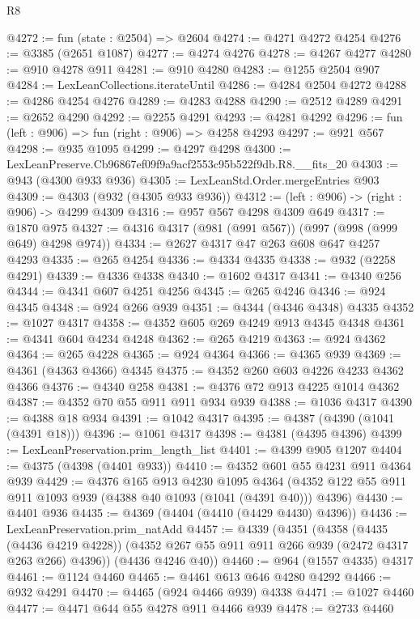 \begin{lexlean}{R8}
\begin{coremodule}
@4272 := fun (state : @2504) => @2604
@4274 := @4271 @4272 @4254
@4276 := @3385 (@2651 @1087)
@4277 := @4274 @4276
@4278 := @4267 @4277
@4280 := @910 @4278 @911
@4281 := @910 @4280
@4283 := @1255 @2504 @907
@4284 := LexLeanCollections.iterateUntil
@4286 := @4284 @2504 @4272
@4288 := @4286 @4254 @4276
@4289 := @4283 @4288
@4290 := @2512 @4289
@4291 := @2652 @4290
@4292 := @2255 @4291
@4293 := @4281 @4292
@4296 := fun (left : @906) => fun (right : @906) => @4258 @4293
@4297 := @921 @567
@4298 := @935 @1095
@4299 := @4297 @4298
@4300 := LexLeanPreserve.Cb96867ef09f9a9acf2553c95b522f9db.R8.__fits_20
@4303 := @943 (@4300 @933 @936)
@4305 := LexLeanStd.Order.mergeEntries @903
@4309 := @4303 (@932 (@4305 @933 @936))
@4312 := (left : @906) -> (right : @906) -> @4299 @4309
@4316 := @957 @567 @4298 @4309 @649
@4317 := @1870 @975
@4327 := @4316 @4317 (@981 (@991 @567)) (@997 (@998 (@999 @649) @4298 @974))
@4334 := @2627 @4317 @47 @263 @608 @647 @4257 @4293
@4335 := @265 @4254
@4336 := @4334 @4335
@4338 := @932 (@2258 @4291)
@4339 := @4336 @4338
@4340 := @1602 @4317
@4341 := @4340 @256
@4344 := @4341 @607 @4251 @4256
@4345 := @265 @4246
@4346 := @924 @4345
@4348 := @924 @266 @939
@4351 := @4344 (@4346 @4348) @4335
@4352 := @1027 @4317
@4358 := @4352 @605 @269 @4249 @913 @4345 @4348
@4361 := @4341 @604 @4234 @4248
@4362 := @265 @4219
@4363 := @924 @4362
@4364 := @265 @4228
@4365 := @924 @4364
@4366 := @4365 @939
@4369 := @4361 (@4363 @4366) @4345
@4375 := @4352 @260 @603 @4226 @4233 @4362 @4366
@4376 := @4340 @258
@4381 := @4376 @72 @913 @4225 @1014 @4362
@4387 := @4352 @70 @55 @911 @911 @934 @939
@4388 := @1036 @4317
@4390 := @4388 @18 @934
@4391 := @1042 @4317
@4395 := @4387 (@4390 (@1041 (@4391 @18)))
@4396 := @1061 @4317
@4398 := @4381 (@4395 @4396)
@4399 := LexLeanPreservation.prim_length_list
@4401 := @4399 @905 @1207
@4404 := @4375 (@4398 (@4401 @933))
@4410 := @4352 @601 @55 @4231 @911 @4364 @939
@4429 := @4376
    @165
    @913
    @4230
    @1095
    @4364
    (@4352 @122 @55 @911 @911 @1093 @939 (@4388 @40 @1093 (@1041 (@4391 @40))) @4396)
@4430 := @4401 @936
@4435 := @4369 (@4404 (@4410 (@4429 @4430) @4396))
@4436 := LexLeanPreservation.prim_natAdd
@4457 := @4339
    (@4351
      (@4358
        (@4435 (@4436 @4219 @4228))
        (@4352 @267 @55 @911 @911 @266 @939 (@2472 @4317 @263 @266) @4396))
      (@4436 @4246 @40))
@4460 := @964 (@1557 @4335) @4317
@4461 := @1124 @4460
@4465 := @4461 @613 @646 @4280 @4292
@4466 := @932 @4291
@4470 := @4465 (@924 @4466 @939) @4338
@4471 := @1027 @4460
@4477 := @4471 @644 @55 @4278 @911 @4466 @939
@4478 := @2733 @4460

\end{coremodule}
\end{lexlean}
